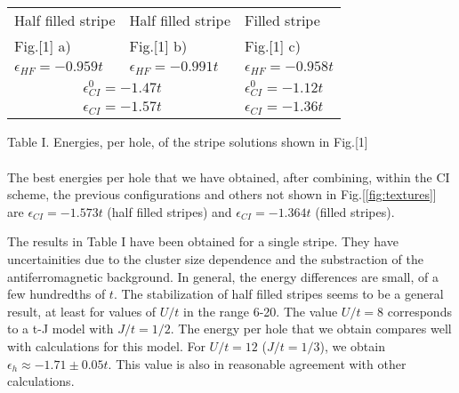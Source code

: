 \vfil\eject
{}
\narrowtext
\begin{tabular}{|l|l|l|}
\hline
Half filled stripe
&Half filled stripe
&Filled stripe \\
Fig.[1] a)
&Fig.[1] b)
&Fig.[1] c) \\
\hline
$\epsilon_{HF} = -0.959 t$
&$\epsilon_{HF} = -0.991 t$
&$\epsilon_{HF} = -0.958 t$ \\ \hline
\multicolumn{2}{|c|}{$\epsilon^0_{CI} = -1.47 t$}
&\multicolumn{1}{l|}{$\epsilon^0_{CI}= -1.12 t$} \\ %
\multicolumn{2}{|c|}{$\epsilon_{CI} = -1.57 t$}
&\multicolumn{1}{l|}{$\epsilon_{CI}= -1.36 t$} \\ \hline
\end{tabular}
Table I. Energies, per hole, of the stripe solutions shown
in Fig.[1] \\ \\
The best energies per hole
that we have obtained, after combining, within the CI scheme,
the previous configurations and others not shown in
Fig.[\ref{fig:textures}] are $\epsilon_{CI} = -1.573t$ (half
filled stripes) and $\epsilon_{CI} = -1.364 t$ (filled stripes).

The results in Table I  have been obtained for a single stripe.
They have uncertainities
due to the cluster size dependence and the substraction of the
antiferromagnetic background. In general, the energy differences are small,
of a few hundredths of $t$.
The stabilization of half filled stripes seems to be
a general result, at least for values of $U/t$ in the range 6-20.
The value $U/t = 8$ corresponds to a t-J model with
$J/t = 1/2$. The energy per hole that we obtain compares
well with calculations for this model\cite{WS00}. For $U/t = 12$
($J/t = 1/3$), we obtain $\epsilon_h \approx -1.71 \pm 0.05 t$.
This value is
also in reasonable agreement with other calculations\cite{WS98b}.


